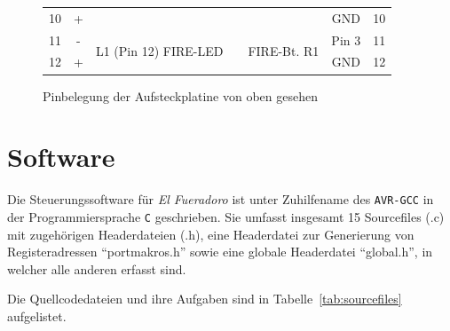 \documentclass[paper=a4, parskip, numbers=noenddot, toc=listof, headsepline]{scrbook}
\newcommand{\anlage}{\emph{El Fueradoro}}
\begin{document}
\begin{figure}
\begin{tabularx}{\textwidth}{|r|clXrc|l|}
				  10 & +   &                                         &   &                                         & GND    & 10 \\
				  11 & -   & \multirow{2}{*}{L1 (Pin 12) FIRE-LED}   &   & \multirow{2}{*}{FIRE-Bt. R1}            & Pin 3  & 11 \\
				  12 & +   &                                         &   &                                         & GND    & 12 \\ \cline{1-1}\cline{7-7}
			  \end{tabularx}
			  \caption{Pinbelegung der Aufsteckplatine von oben gesehen}
			  \label{fig:piclamps}
		  \end{figure}

		\chapter{Software}

		 Die Steuerungssoftware für {\anlage} ist unter Zuhilfename des \texttt{AVR-GCC} in der Programmiersprache \texttt{C} geschrieben. Sie umfasst insgesamt 15 Sourcefiles (.c) mit zugehörigen Headerdateien (.h), eine Headerdatei zur Generierung von Registeradressen \enquote{portmakros.h} sowie eine globale Headerdatei \enquote{global.h}, in welcher alle anderen erfasst sind.

		 Die Quellcodedateien und ihre Aufgaben sind in Tabelle~\ref{tab:sourcefiles} aufgelistet.
\end{document}
